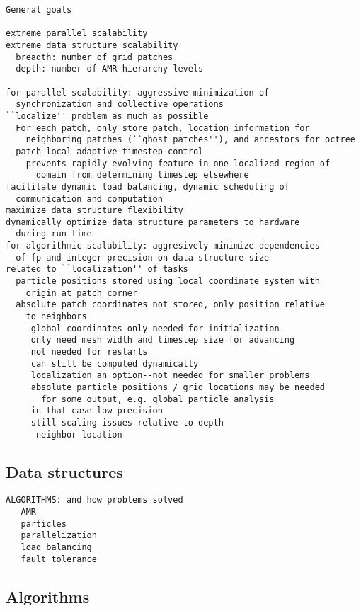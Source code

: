 \documentclass[14pt,letter]{article}
\begin{document}
\begin{verbatim}
General goals

extreme parallel scalability
extreme data structure scalability
  breadth: number of grid patches
  depth: number of AMR hierarchy levels

for parallel scalability: aggressive minimization of
  synchronization and collective operations
``localize'' problem as much as possible
  For each patch, only store patch, location information for
    neighboring patches (``ghost patches''), and ancestors for octree
  patch-local adaptive timestep control
    prevents rapidly evolving feature in one localized region of
      domain from determining timestep elsewhere
facilitate dynamic load balancing, dynamic scheduling of
  communication and computation
maximize data structure flexibility
dynamically optimize data structure parameters to hardware
  during run time
for algorithmic scalability: aggresively minimize dependencies
  of fp and integer precision on data structure size
related to ``localization'' of tasks
  particle positions stored using local coordinate system with
    origin at patch corner
  absolute patch coordinates not stored, only position relative
    to neighbors
     global coordinates only needed for initialization
     only need mesh width and timestep size for advancing
     not needed for restarts
     can still be computed dynamically
     localization an option--not needed for smaller problems
     absolute particle positions / grid locations may be needed
       for some output, e.g. global particle analysis
     in that case low precision
     still scaling issues relative to depth
      neighbor location
\end{verbatim}

\subsection{Data structures} \label{ss:datastructures}

\begin{verbatim}
ALGORITHMS: and how problems solved
   AMR
   particles
   parallelization
   load balancing
   fault tolerance
\end{verbatim}


\subsection{Algorithms} \label{ss:algorithms}
\end{document}
